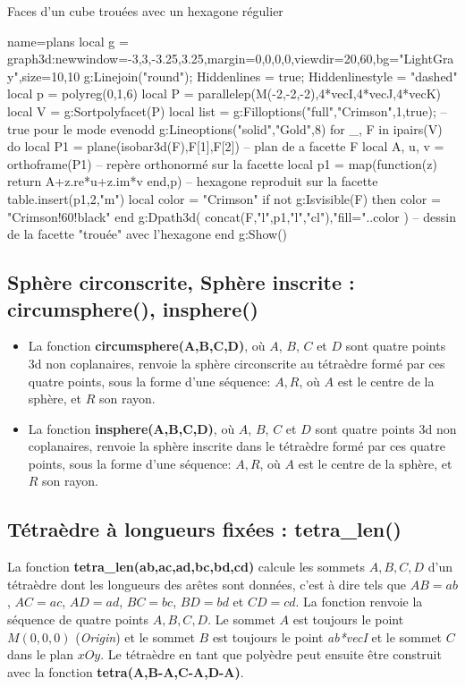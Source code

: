 \begin{demo}{Faces d'un cube trouées avec un hexagone régulier}
\begin{luadraw}{name=plans}
local g = graph3d:new{window={-3,3,-3.25,3.25},margin={0,0,0,0},viewdir={20,60},bg="LightGray",size={10,10}}
g:Linejoin("round"); Hiddenlines = true; Hiddenlinestyle = "dashed"
local p = polyreg(0,1,6)
local P = parallelep(M(-2,-2,-2),4*vecI,4*vecJ,4*vecK)
local V = g:Sortpolyfacet(P)
local list = {}
g:Filloptions("full","Crimson",1,true); -- true pour le mode evenodd
g:Lineoptions("solid","Gold",8)
for _, F in  ipairs(V) do
    local P1 = plane(isobar3d(F),F[1],F[2]) -- plan de a facette F
    local A, u, v = orthoframe(P1)  -- repère orthonormé sur la facette
    local p1 = map(function(z) return A+z.re*u+z.im*v end,p) -- hexagone reproduit sur la facette
    table.insert(p1,2,"m")
    local color = "Crimson"
    if not g:Isvisible(F) then  color = "Crimson!60!black" end
    g:Dpath3d( concat(F,{"l"},p1,{"l","cl"}),"fill="..color ) -- dessin de la facette "trouée" avec l'hexagone
end
g:Show()
\end{luadraw}
\end{demo}

\subsection{Sphère circonscrite, Sphère inscrite : circumsphere(), insphere()}

\begin{itemize}
    \item La fonction \textbf{circumsphere(A,B,C,D)}, où $A$, $B$, $C$ et $D$ sont quatre points 3d non coplanaires, renvoie la sphère circonscrite au tétraèdre formé par ces quatre points, sous la forme d'une séquence: $A,R$, où $A$ est le centre de la sphère, et $R$ son rayon.
    \item La fonction \textbf{insphere(A,B,C,D)}, où $A$, $B$, $C$ et $D$ sont quatre points 3d non coplanaires, renvoie la sphère inscrite dans le tétraèdre formé par ces quatre points, sous la forme d'une séquence: $A,R$, où $A$ est le centre de la sphère, et $R$ son rayon.
\end{itemize}

\subsection{Tétraèdre à longueurs fixées : tetra\_len()}

La fonction \textbf{tetra\_len(ab,ac,ad,bc,bd,cd)} calcule les sommets $A,B,C,D$ d'un tétraèdre dont les longueurs des arêtes sont données, c'est à dire tels que $AB=ab$, $AC=ac$, $AD=ad$, $BC=bc$, $BD=bd$ et $CD=cd$. La fonction renvoie la séquence de quatre points $A,B,C,D$. Le sommet $A$ est toujours le point $M(0,0,0)$ (\emph{Origin}) et le sommet $B$ est toujours le point \emph{ab*vecI} et le sommet $C$ dans le plan $xOy$. Le tétraèdre en tant que polyèdre peut ensuite être construit avec la fonction \textbf{tetra(A,B-A,C-A,D-A)}.

